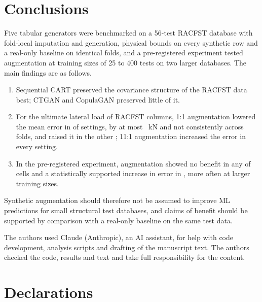 \documentclass[pdflatex,sn-basic]{sn-jnl}
\begin{document}
\section{Conclusions}\label{sec:conclusions}

Five tabular generators were benchmarked on a 56-test RACFST database with fold-local imputation and generation,
physical bounds on every synthetic row and a real-only baseline on identical folds, and a pre-registered
experiment tested augmentation at training sizes of 25 to 400 tests on two larger databases. The main findings
are as follows.
\begin{enumerate}
\item Sequential CART preserved the covariance structure of the RACFST data best; CTGAN and CopulaGAN preserved
little of it.
\item For the ultimate lateral load of RACFST columns, 1:1 augmentation lowered the mean error in
\regBetterOne{} of \regSettings{} settings, by at most \regBestGainOne~kN and not consistently across folds, and
raised it in the other \regWorseOne; 11:1 augmentation increased the error in every setting.
\item In the pre-registered experiment, augmentation showed no benefit in any of \eoneCells{} cells and a
statistically supported increase in error in \eoneHarm{}, more often at larger training sizes.
\end{enumerate}
Synthetic augmentation should therefore not be assumed to improve ML predictions for small structural test
databases, and claims of benefit should be supported by comparison with a real-only baseline on the same test
data.

\backmatter

The authors used Claude (Anthropic), an AI assistant, for help with code development, analysis scripts and
drafting of the manuscript text. The authors checked the code, results and text and take full responsibility for
the content.

\section*{Declarations}
\end{document}
